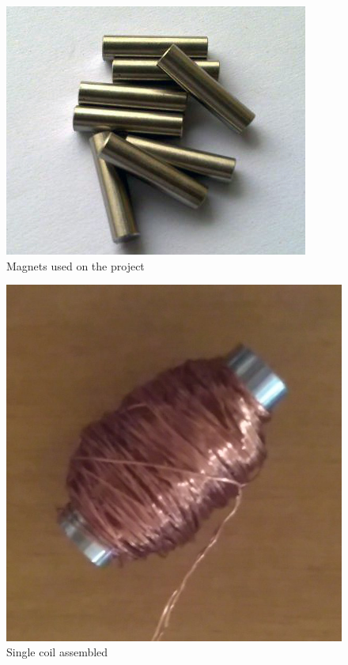 \begin{figure}[!htpb]
  \centering
  \caption{Magnets used on the project}
  \label{magnets}
  \includegraphics[scale=0.3]{images/magnets}
\end{figure}

\begin{figure}[!htpb]
  \centering
  \caption{Single coil assembled}
  \label{coils}
  \includegraphics[scale=0.15]{images/coils}
\end{figure}

